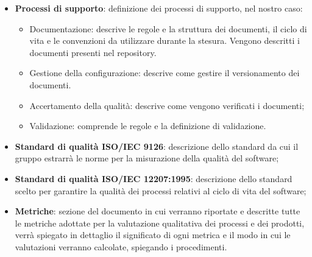 \begin{itemize}
\begin{itemize}
            \item \textbf{Processi di supporto}: definizione dei processi di supporto, nel nostro caso:
            \begin{itemize}
                \item Documentazione: descrive le regole e la struttura dei documenti, il ciclo di vita e le convenzioni da utilizzare durante la stesura. Vengono descritti i documenti presenti nel repository.
                \item Gestione della configurazione: descrive come gestire il versionamento dei documenti.
                \item Accertamento della qualità: descrive come vengono verificati i documenti;
                \item Validazione: comprende le regole e la definizione di validazione.
            \end{itemize}
            \item \textbf{Standard di qualità ISO/IEC 9126}: descrizione dello standard da cui il gruppo estrarrà le norme per la misurazione della qualità del software;
            \item \textbf{Standard di qualità ISO/IEC 12207:1995}: descrizione dello standard scelto per garantire la qualità dei processi relativi al ciclo di vita del software;
            \item \textbf{Metriche}: sezione del documento in cui verranno riportate e descritte tutte le metriche adottate per la valutazione qualitativa dei processi e dei prodotti, verrà spiegato in dettaglio il significato di ogni metrica e il modo in cui le valutazioni verranno calcolate, spiegando i procedimenti.
             
        \end{itemize}
        \end{itemize}
